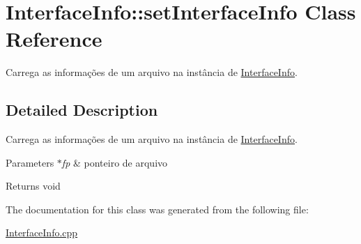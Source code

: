 \hypertarget{class_interface_info_1_1set_interface_info}{}\section{Interface\+Info\+:\+:set\+Interface\+Info Class Reference}
\label{class_interface_info_1_1set_interface_info}


Carrega as informações de um arquivo na instância de \hyperlink{class_interface_info}{Interface\+Info}.  




\subsection{Detailed Description}
Carrega as informações de um arquivo na instância de \hyperlink{class_interface_info}{Interface\+Info}. 


\begin{DoxyParams}{Parameters}
{\em $\ast$fp} & ponteiro de arquivo \\
\hline
\end{DoxyParams}
\begin{DoxyReturn}{Returns}
void 
\end{DoxyReturn}


The documentation for this class was generated from the following file\+:\begin{DoxyCompactItemize}
\item 
\hyperlink{_interface_info_8cpp}{Interface\+Info.\+cpp}\end{DoxyCompactItemize}
